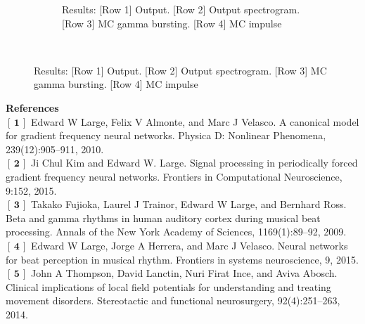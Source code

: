 \documentclass[12pt]{article}
\begin{document}
\begin{figure}
\begin{subfigure}[t]{0.41\textwidth}
        \caption{Results: [Row 1] Output. [Row 2] Output spectrogram. [Row 3] MC gamma bursting. [Row 4] MC impulse}
        \label{fig:system}
    \end{subfigure}
    ~ %
\label{fig:animals}
\end{figure}



{\bf References}\\
$\mathbf{[\,1\,]}$ Edward W Large, Felix V Almonte, and Marc J Velasco. A canonical model for
gradient frequency neural networks. Physica D: Nonlinear Phenomena, 239(12):905–911, 2010.\\
$\mathbf{[\,2\,]}$ Ji Chul Kim and Edward W. Large. Signal processing in periodically forced gradient frequency neural networks. Frontiers in Computational Neuroscience, 9:152, 2015.\\
$\mathbf{[\,3\,]}$ Takako Fujioka, Laurel J Trainor, Edward W Large, and Bernhard Ross. Beta and gamma rhythms in human auditory cortex during musical beat processing. Annals of the New York Academy of Sciences, 1169(1):89–92, 2009.\\
$\mathbf{[\,4\,]}$ Edward W Large, Jorge A Herrera, and Marc J Velasco. Neural networks for beat perception in musical rhythm. Frontiers in systems neuroscience, 9, 2015. \\
$\mathbf{[\,5\,]}$ John A Thompson, David Lanctin, Nuri Firat Ince, and Aviva Abosch. Clinical implications of local field potentials for understanding and treating movement disorders. Stereotactic and functional neurosurgery, 92(4):251–263, 2014.

% 
% 
% 
\end{document}
